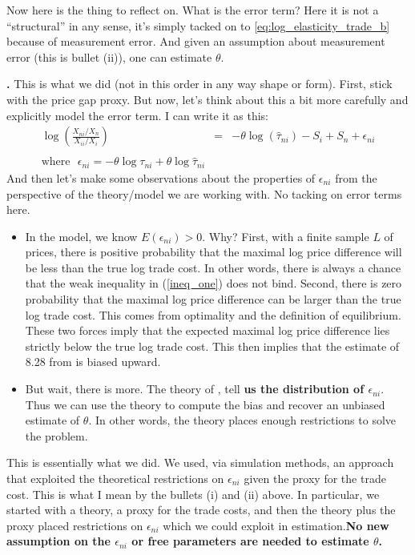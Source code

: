 \documentclass[pdftex,12pt]{article}
\begin{document}
Now here is the thing to reflect on. What is the error term? Here it is not a ``structural'' in any sense, it's simply tacked on to \ref{eq:log_elasticity_trade_b} because of measurement error. And given an assumption about measurement error (this is bullet (ii)), one can estimate $\theta$.

\textbf{\citet{sw_jie}.} This is what we did (not in this order in any way shape or form). First, stick with the price gap proxy. But now, let's think about this a bit more carefully and explicitly model the error term. I can write it as this:
\begin{eqnarray}
\displaystyle \log\left(\frac{X_{ni}/X_n}{X_{ii}/X_i}\right)&=&-\theta \log\left(\hat \tau_{ni}\right) -  S_i +  S_n + \epsilon_{ni}\\
\nonumber \\
\mbox{where} \ \ \ \epsilon_{ni} =  -\theta \log {\tau}_{ni} + \theta \log \hat{\tau}_{ni}
\label{eq:log_elasticity_trade_sw_jie}
\end{eqnarray}
And then let's make some observations about the properties of $\epsilon_{ni}$ from the perspective of the theory/model we are working with. No tacking on error terms here.
\begin{itemize}
\item In the \citet{eaton2002technology} model, we know $E(\epsilon_{ni}) > 0$. Why? First, with a finite sample $L$ of prices, there is positive probability that the maximal log price difference will be less than the true log trade cost. In other words, there is always a chance that the weak inequality in (\ref{ineq_one}) does not bind. Second, there is zero probability that the maximal log price difference can be larger than the true log trade cost. This comes from optimality and the definition of equilibrium. These two forces imply that the expected maximal log price difference lies strictly below the true log trade cost. This then implies that the estimate of 8.28 from \citet{eaton2002technology} is biased upward.

\item But wait, there is more. The theory of \citet{eaton2002technology}, tell \textbf{us the distribution of $\epsilon_{ni}$}. Thus we can use the theory to compute the bias and recover an unbiased estimate of $\theta$. In other words, the theory places enough restrictions to solve the problem.
\end{itemize}
This is essentially what we did. We used, via simulation methods, an approach that exploited the theoretical restrictions on $\epsilon_{ni}$ given the proxy for the trade cost. This is what I mean by the bullets (i) and (ii) above. In particular, we started with a theory, a proxy for the trade costs, and then the theory plus the proxy placed restrictions on $\epsilon_{ni}$ which we could exploit in estimation.\textbf{No new assumption on the $\epsilon_{ni}$ or free parameters are needed to estimate $\theta$.}
\end{document}
